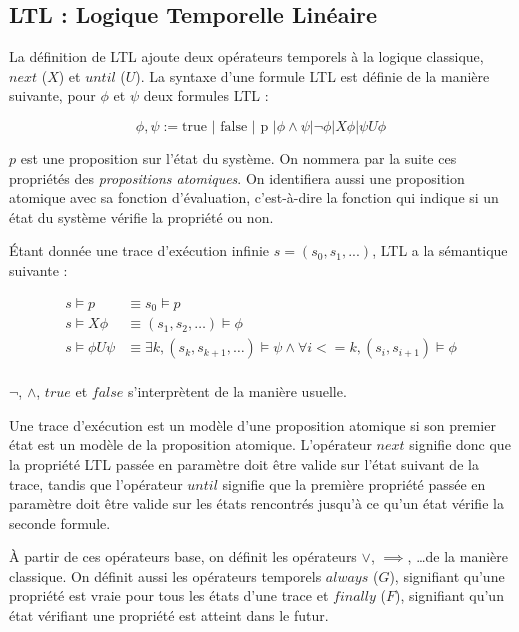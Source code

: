 \subsection{LTL : Logique Temporelle Linéaire}

La définition de \ac{LTL}\cite{pnueli_LTL} ajoute deux opérateurs temporels à la
logique classique, \(next\) (\(X\)) et \(until\) (\(U\)). La syntaxe d'une
formule \ac{LTL} est définie de la manière suivante, pour \(\phi\) et \(\psi\)
deux formules \ac{LTL} :

\[
\phi, \psi := \text{true }| \text{ false } | \text{ p } |
             \phi \land \psi | \lnot \phi | X \phi | \psi U \phi
\]

\(p\) est une proposition sur l'état du système. On nommera par la suite
ces propriétés des \emph{propositions atomiques}. On identifiera aussi
une proposition atomique avec sa fonction d'évaluation, c'est-à-dire la
fonction qui indique si un état du système vérifie la propriété ou non.

Étant donnée une trace d'exécution infinie \(s = (s_0, s_1, ...)\), \ac{LTL} a
la sémantique suivante :

\[
\begin{aligned}
s \models p & \equiv s_0 \models p \\
s \models X \phi & \equiv (s_1, s_2, \dots) \models \phi \\
s \models \phi U \psi & \equiv \exists k, (s_k, s_{k+1}, \dots) \models \psi
                        \land \forall i <= k, (s_i, s_{i+1}) \models \phi \\
\end{aligned}
\]

\(\lnot\), \(\land\), \(true\) et \(false\) s'interprètent de la manière
usuelle.

Une trace d'exécution est un modèle d'une proposition atomique si son premier
état est un modèle de la proposition atomique.
L'opérateur \(next\) signifie donc que la propriété \ac{LTL} passée en
paramètre doit être valide sur l'état suivant de la trace, tandis que
l'opérateur \(until\) signifie que la première propriété passée en
paramètre doit être valide sur les états rencontrés jusqu'à ce qu’un
état vérifie la seconde formule.

À partir de ces opérateurs base, on définit les opérateurs \(\lor\),
\(\implies\), \dots de la manière classique. On définit aussi les
opérateurs temporels \(always\) (\(G\)), signifiant qu'une propriété est
vraie pour tous les états d'une trace et \(finally\) (\(F\)), signifiant
qu'un état vérifiant une propriété est atteint dans le futur.

